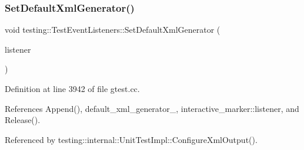 \subsubsection{\texorpdfstring{Set\+Default\+Xml\+Generator()}{SetDefaultXmlGenerator()}}
{\footnotesize\ttfamily void testing\+::\+Test\+Event\+Listeners\+::\+Set\+Default\+Xml\+Generator (\begin{DoxyParamCaption}\item[{\hyperlink{classtesting_1_1TestEventListener}{Test\+Event\+Listener} $\ast$}]{listener }\end{DoxyParamCaption})\hspace{0.3cm}{\ttfamily [private]}}



Definition at line 3942 of file gtest.\+cc.



References Append(), default\+\_\+xml\+\_\+generator\+\_\+, interactive\+\_\+marker\+::listener, and Release().



Referenced by testing\+::internal\+::\+Unit\+Test\+Impl\+::\+Configure\+Xml\+Output().


